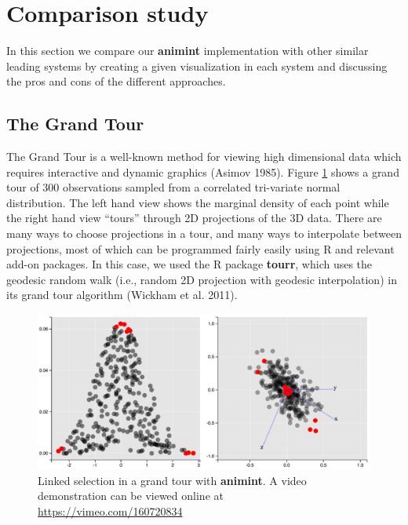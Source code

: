 \documentclass[12pt,]{article}
\theoremstyle{definition}
\theoremstyle{definition}
\theoremstyle{definition}
\theoremstyle{remark}
\begin{document}
\hypertarget{compare}{%
\section{Comparison study}\label{compare}}

In this section we compare our \textbf{animint} implementation with
other similar leading systems by creating a given visualization in each
system and discussing the pros and cons of the different approaches.

\hypertarget{tour}{%
\subsection{The Grand Tour}\label{tour}}

The Grand Tour is a well-known method for viewing high dimensional data
which requires interactive and dynamic graphics (Asimov 1985). Figure
\ref{fig:tour} shows a grand tour of 300 observations sampled from a
correlated tri-variate normal distribution. The left hand view shows the
marginal density of each point while the right hand view ``tours''
through 2D projections of the 3D data. There are many ways to choose
projections in a tour, and many ways to interpolate between projections,
most of which can be programmed fairly easily using R and relevant
add-on packages. In this case, we used the R package \textbf{tourr},
which uses the geodesic random walk (i.e., random 2D projection with
geodesic interpolation) in its grand tour algorithm (Wickham et al.
2011).

\begin{figure}
\centering
\includegraphics{images/tour}
\caption{\label{fig:tour}Linked selection in a grand tour with
\textbf{animint}. A video demonstration can be viewed online at
\url{https://vimeo.com/160720834}}
\end{figure}
\end{document}
